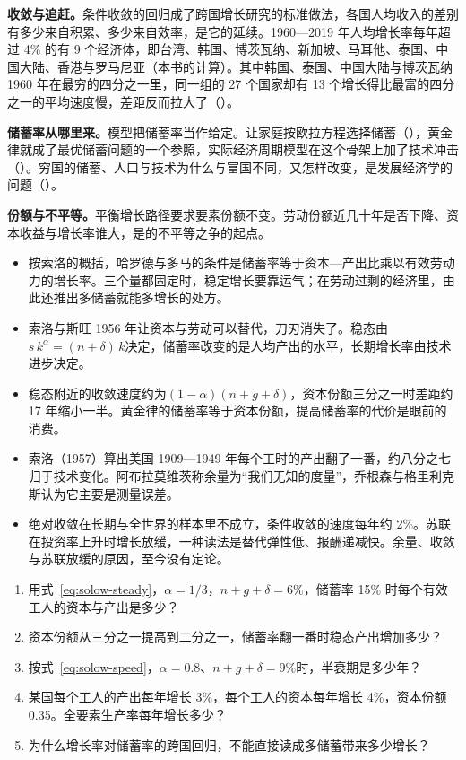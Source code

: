 \textbf{收敛与追赶。}条件收敛的回归成了跨国增长研究的标准做法，各国人均收入的差别有多少来自积累、多少来自效率，是它的延续。1960—2019 年人均增长率每年超过 4\% 的有 9 个经济体，即台湾、韩国、博茨瓦纳、新加坡、马耳他、泰国、中国大陆、香港与罗马尼亚（本书的计算）。其中韩国、泰国、中国大陆与博茨瓦纳 1960 年在最穷的四分之一里，同一组的 27 个国家却有 13 个增长得比最富的四分之一的平均速度慢，差距反而拉大了（）。

\textbf{储蓄率从哪里来。}模型把储蓄率当作给定。让家庭按欧拉方程选择储蓄（），黄金律就成了最优储蓄问题的一个参照，实际经济周期模型在这个骨架上加了技术冲击（）。穷国的储蓄、人口与技术为什么与富国不同，又怎样改变，是发展经济学的问题（）。

\textbf{份额与不平等。}平衡增长路径要求要素份额不变。劳动份额近几十年是否下降、资本收益与增长率谁大，是的不平等之争的起点。

\begin{takeaways}
\begin{itemize}
\item 按索洛的概括，哈罗德与多马的条件是储蓄率等于资本—产出比乘以有效劳动力的增长率。三个量都固定时，稳定增长要靠运气；在劳动过剩的经济里，由此还推出多储蓄就能多增长的处方。
\item 索洛与斯旺 1956 年让资本与劳动可以替代，刀刃消失了。稳态由$s\,k^{\alpha}=(n+\delta)\,k$决定，储蓄率改变的是人均产出的水平，长期增长率由技术进步决定。
\item 稳态附近的收敛速度约为$(1-\alpha)(n+g+\delta)$，资本份额三分之一时差距约 17 年缩小一半。黄金律的储蓄率等于资本份额，提高储蓄率的代价是眼前的消费。
\item 索洛（1957）算出美国 1909—1949 年每个工时的产出翻了一番，约八分之七归于技术变化。阿布拉莫维茨称余量为“我们无知的度量”，乔根森与格里利克斯认为它主要是测量误差。
\item 绝对收敛在长期与全世界的样本里不成立，条件收敛的速度每年约 2\%。苏联在投资率上升时增长放缓，一种读法是替代弹性低、报酬递减快。余量、收敛与苏联放缓的原因，至今没有定论。
\end{itemize}
\end{takeaways}

\begin{selfcheck}
\begin{enumerate}
\item 用式~\eqref{eq:solow-steady}，$\alpha=1/3$，$n+g+\delta=6\%$，储蓄率 15\% 时每个有效工人的资本与产出是多少？
\item 资本份额从三分之一提高到二分之一，储蓄率翻一番时稳态产出增加多少？
\item 按式~\eqref{eq:solow-speed}，$\alpha=0.8$、$n+g+\delta=9\%$时，半衰期是多少年？
\item 某国每个工人的产出每年增长 3\%，每个工人的资本每年增长 4\%，资本份额 0.35。全要素生产率每年增长多少？
\item 为什么增长率对储蓄率的跨国回归，不能直接读成多储蓄带来多少增长？
\end{enumerate}
\end{selfcheck}

